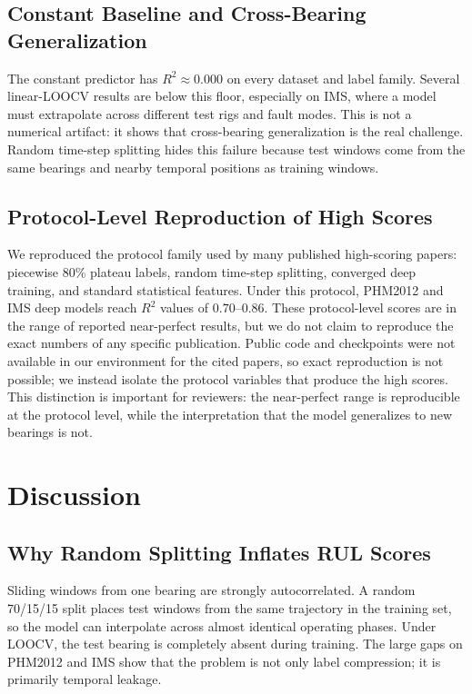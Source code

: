 \documentclass[5p,twocolumn]{elsarticle}
\begin{document}
\subsection{Constant Baseline and Cross-Bearing Generalization}
The constant predictor has $R^2 \approx 0.000$ on every dataset and label family. Several linear-LOOCV results are below this floor, especially on IMS, where a model must extrapolate across different test rigs and fault modes. This is not a numerical artifact: it shows that cross-bearing generalization is the real challenge. Random time-step splitting hides this failure because test windows come from the same bearings and nearby temporal positions as training windows.

\subsection{Protocol-Level Reproduction of High Scores}
We reproduced the protocol family used by many published high-scoring papers: piecewise 80\% plateau labels, random time-step splitting, converged deep training, and standard statistical features. Under this protocol, PHM2012 and IMS deep models reach $R^2$ values of $0.70$--$0.86$. These protocol-level scores are in the range of reported near-perfect results, but we do not claim to reproduce the exact numbers of any specific publication. Public code and checkpoints were not available in our environment for the cited papers, so exact reproduction is not possible; we instead isolate the protocol variables that produce the high scores. This distinction is important for reviewers: the near-perfect range is reproducible at the protocol level, while the interpretation that the model generalizes to new bearings is not.

\section{Discussion}
\subsection{Why Random Splitting Inflates RUL Scores}
Sliding windows from one bearing are strongly autocorrelated. A random 70/15/15 split places test windows from the same trajectory in the training set, so the model can interpolate across almost identical operating phases. Under LOOCV, the test bearing is completely absent during training. The large gaps on PHM2012 and IMS show that the problem is not only label compression; it is primarily temporal leakage.
\end{document}
